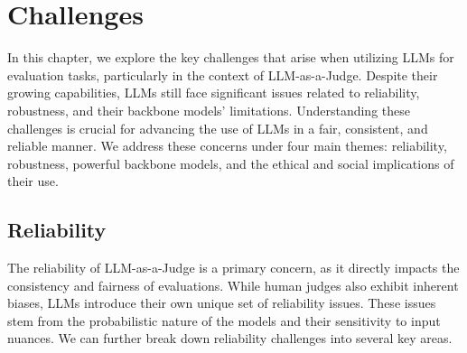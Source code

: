 \documentclass[acmsmall,screen]{acmart}
\begin{document}





\section{Challenges}\label{sec:challenges}

In this chapter, we explore the key challenges that arise when utilizing LLMs for evaluation tasks, particularly in the context of LLM-as-a-Judge. Despite their growing capabilities, LLMs still face significant issues related to reliability, robustness, and their backbone models' limitations. Understanding these challenges is crucial for advancing the use of LLMs in a fair, consistent, and reliable manner. We address these concerns under four main themes: reliability, robustness, powerful backbone models, and the ethical and social implications of their use.

\subsection{Reliability}
\label{subsec: challenge_reliability}
The reliability of LLM-as-a-Judge is a primary concern, as it directly impacts the consistency and fairness of evaluations. While human judges also exhibit inherent biases, LLMs introduce their own unique set of reliability issues. These issues stem from the probabilistic nature of the models and their sensitivity to input nuances. We can further break down reliability challenges into several key areas.
\end{document}
